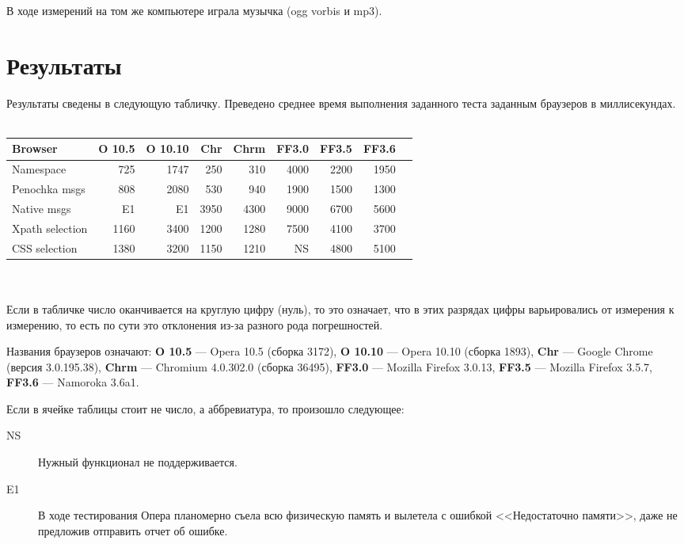 \documentclass[a4papre,12pt]{article}
\begin{document}
В ходе измерений на том же компьютере играла музычка (ogg vorbis и mp3).

\section{Результаты}

Результаты сведены в следующую табличку. Преведено среднее время выполнения
заданного теста заданным браузеров в миллисекундах.\\
\\
\begin{tabular}{l|r r r r r r r r }
\textbf{Browser} & \textbf{O 10.5} & \textbf{O 10.10} & \textbf{Chr} &
\textbf{Chrm} & \textbf{FF3.0} & \textbf{FF3.5} & \textbf{FF3.6} \\
\hline
Namespace       & 725   & 1747  & 250   & 310   & 4000  & 2200  & 1950 \\
Penochka msgs   & 808   & 2080  & 530   & 940   & 1900  & 1500  & 1300 \\
Native msgs     & E1    & E1    & 3950  & 4300  & 9000  & 6700  & 5600 \\
Xpath selection & 1160  & 3400  & 1200  & 1280  & 7500  & 4100  & 3700 \\
CSS selection   & 1380  & 3200  & 1150  & 1210  & NS    & 4800  & 5100 \\
\end{tabular}\\
\\
Если в табличке число оканчивается на круглую цифру (нуль), то это
означает, что в этих разрядах цифры варьировались от измерения к измерению,
то есть по сути это отклонения из-за разного рода погрешностей.

Названия браузеров означают: \textbf{O 10.5} --- Opera 10.5 (сборка 3172),
\textbf{O 10.10} --- Opera 10.10 (сборка 1893), \textbf{Chr} --- Google
Chrome (версия 3.0.195.38), \textbf{Chrm} --- Chromium 4.0.302.0 (сборка
36495), \textbf{FF3.0} --- Mozilla Firefox 3.0.13, \textbf{FF3.5} ---
Mozilla Firefox 3.5.7, \textbf{FF3.6} --- Namoroka 3.6a1.

Если в ячейке таблицы стоит не число, а аббревиатура, то произошло
следующее:
\begin{description}
\item[NS] Нужный функционал не поддерживается.
\item[E1] В ходе тестирования Опера планомерно съела всю физическую память
  и вылетела с ошибкой <<Недостаточно памяти>>, даже не предложив отправить
  отчет об ошибке.
\end{description}
\end{document}
